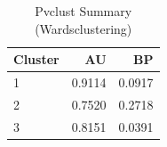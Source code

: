 \begin{table}[htbp]
  \centering
  \caption{Pvclust Summary (Wardsclustering)}
  \label{tab:WardsClustering_tables_pvclust_summary}
  \begin{tabular}{lrr}
    \toprule
    Cluster & AU & BP \\
    \midrule
    1 & 0.9114 & 0.0917 \\
    2 & 0.7520 & 0.2718 \\
    3 & 0.8151 & 0.0391 \\
    \bottomrule
  \end{tabular}
\end{table}
